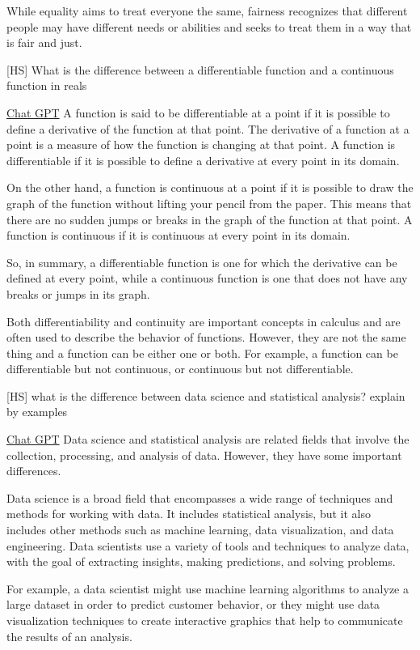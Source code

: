 \documentclass[
]{book}
\theoremstyle{definition}
\theoremstyle{definition}
\theoremstyle{definition}
\theoremstyle{definition}
\theoremstyle{remark}
\begin{document}
While equality aims to treat everyone the same, fairness recognizes that different people may have different needs or abilities and seeks to treat them in a way that is fair and just.

{[}HS{]} What is the difference between a differentiable function and a continuous function in reals

\protect\hyperlink{chatgpt}{Chat GPT} A function is said to be differentiable at a point if it is possible to define a derivative of the function at that point. The derivative of a function at a point is a measure of how the function is changing at that point. A function is differentiable if it is possible to define a derivative at every point in its domain.

On the other hand, a function is continuous at a point if it is possible to draw the graph of the function without lifting your pencil from the paper. This means that there are no sudden jumps or breaks in the graph of the function at that point. A function is continuous if it is continuous at every point in its domain.

So, in summary, a differentiable function is one for which the derivative can be defined at every point, while a continuous function is one that does not have any breaks or jumps in its graph.

Both differentiability and continuity are important concepts in calculus and are often used to describe the behavior of functions. However, they are not the same thing and a function can be either one or both. For example, a function can be differentiable but not continuous, or continuous but not differentiable.

{[}HS{]} what is the difference between data science and statistical analysis? explain by examples

\protect\hyperlink{chatgpt}{Chat GPT} Data science and statistical analysis are related fields that involve the collection, processing, and analysis of data. However, they have some important differences.

Data science is a broad field that encompasses a wide range of techniques and methods for working with data. It includes statistical analysis, but it also includes other methods such as machine learning, data visualization, and data engineering. Data scientists use a variety of tools and techniques to analyze data, with the goal of extracting insights, making predictions, and solving problems.

For example, a data scientist might use machine learning algorithms to analyze a large dataset in order to predict customer behavior, or they might use data visualization techniques to create interactive graphics that help to communicate the results of an analysis.
\end{document}
